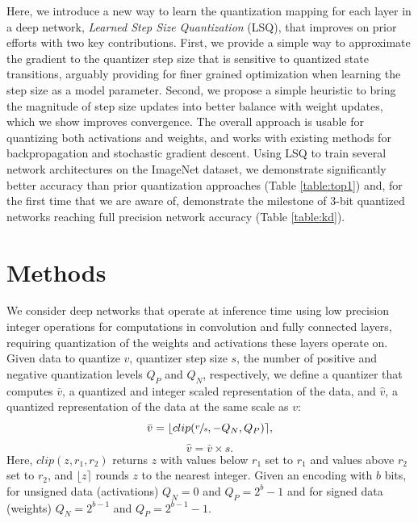 \documentclass{article}
\begin{document}
Here, we introduce a new way to learn the quantization mapping for each layer in a deep network, \textit{Learned Step Size Quantization} (LSQ), that improves on prior efforts with two key contributions.
%
First, we provide a simple way to approximate the gradient to the quantizer step size that is sensitive to quantized state transitions, 
arguably providing for finer grained optimization when learning the step size as a model parameter.
%
Second, we propose a simple heuristic to bring the magnitude of step size updates into better balance with weight updates, which we show improves convergence.
%
The overall approach is usable for quantizing both activations and weights, and works with existing methods for backpropagation and stochastic gradient descent.
%
Using LSQ to train several network architectures on the ImageNet dataset, we demonstrate 
significantly better accuracy than prior quantization approaches (Table \ref{table:top1}) and,
for the first time that we are aware of, demonstrate the milestone of 3-bit quantized networks reaching full precision network accuracy (Table \ref{table:kd}).



\section{Methods}

We consider deep networks that operate at inference time using low precision integer operations for computations in convolution and fully connected layers, requiring quantization of the weights and activations these layers operate on.
%
Given data to quantize $v$, quantizer step size $s$, the number of positive and negative quantization levels $Q_P$ and $Q_N$, respectively, we define a quantizer that computes $\bar{v}$, a quantized and integer scaled representation of the data, and $\hat{v}$, a quantized representation of the data at the same scale as $v$:
\begin{equation}
	\label{eq:quantization1}
	\bar{v} = \lfloor clip( \sfrac{v}{s}, -Q_N, Q_P) \rceil,
\end{equation}
\begin{equation}
	\label{eq:quantization2}
	\hat{v} = \bar{v} \times s.
\end{equation}
Here, $clip(z,r_1,r_2)$ returns $z$ with values below $r_1$ set to $r_1$ and values above $r_2$ set to $r_2$, and $\lfloor z \rceil$ rounds $z$ to the nearest integer.
Given an encoding with $b$ bits, for unsigned data (activations) $Q_N=0$ and $Q_P=2^b-1$ and for signed data (weights) $Q_N=2^{b-1}$ and $Q_P=2^{b-1}-1$. 
\end{document}
